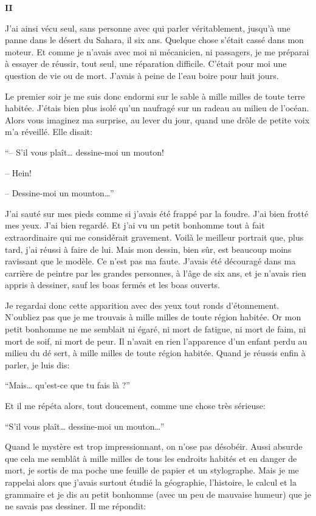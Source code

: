 \begin{Parallel}[p]{}{}
{\textbf{II}

J'ai ainsi vécu seul, sans personne avec qui parler
véritablement, jusqu’à une panne dans le désert du
Sahara, il six ans. Quelque chose s'était cassé
dans mon moteur. Et comme je n'avais avec moi ni
mécanicien, ni passagers, je me préparai à essayer
de réussir, tout seul, une réparation difficile. C'était
pour moi une question de vie ou de mort. J'avais à
peine de l'eau boire pour huit jours.

Le premier soir je me suis donc endormi sur le
sable à mille milles de toute terre habitée. J'étais
bien plus isolé qu'un naufragé sur un radeau au
milieu de l'océan. Alors vous imaginez ma surprise,
au lever du jour, quand une drôle de petite voix m'a
réveillé. Elle disait:

``-- S'il vous plaît\ldots{} dessine-moi un mouton!

-- Hein!

-- Dessine-moi un mounton\ldots{}''

J'ai sauté sur mes pieds comme si j'avais été
frappé par la foudre. J'ai bien frotté mes yeux. J'ai bien regardé. Et j'ai vu un petit bonhomme tout à
fait extraordinaire qui me considérait gravement.
Voilà le meilleur portrait que, plus tard, j'ai réussi à
faire de lui. Mais mon dessin, bien sûr, est beaucoup
moins ravissant que le modèle. Ce n'est pas ma
faute. J'avais été découragé dans ma carrière de
peintre par les grandes personnes, à l'âge de six ans,
et je n'avais rien appris à dessiner, sauf les boas fermés et les boas ouverts.

Je regardai donc cette apparition avec des yeux
tout ronds d'étonnement. N'oubliez pas que je me
trouvais à mille milles de toute région habitée. Or
mon petit bonhomme ne me semblait ni égaré, ni
mort de fatigue, ni mort de faim, ni mort de soif, ni
mort de peur. Il n'avait en rien l'apparence d’un
enfant perdu au milieu du dé sert, à mille milles de
toute région habitée. Quand je réussis enfin à parler, je luis dis:

``Mais\ldots{} qu'est-ce que tu fais là ?''

Et il me répéta alors, tout doucement, comme
une chose très sérieuse:

``S'il vous plaît\ldots{} dessine-moi un mouton\ldots{}''

Quand le mystère est trop impressionnant, on
n'ose pas désobéir. Aussi absurde que cela me semblât à mille milles de tous les endroits habités et en
danger de mort, je sortis de ma poche une feuille de
papier et un stylographe. Mais je me rappelai alors
que j'avais surtout étudié la géographie, l'histoire, le
calcul et la grammaire et je dis au petit bonhomme
(avec un peu de mauvaise humeur) que je ne savais
pas dessiner. Il me répondit:

}
\end{Parallel}
